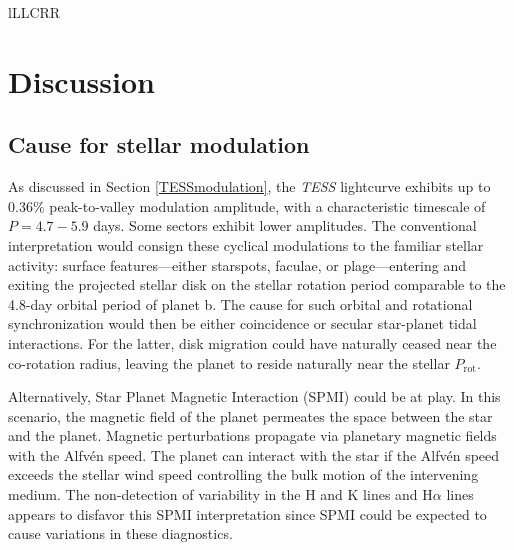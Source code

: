\documentclass[twocolumn]{aastex631}
\begin{document}
\begin{deluxetable*}{lLLCRR}
    \tablewidth{0pc}
    \startdata
    
    \enddata
\end{deluxetable*}

\section{Discussion}\label{secDiscuss}

\subsection{Cause for stellar modulation}
As discussed in Section \ref{TESSmodulation}, the \emph{TESS} lightcurve exhibits up to $0.36\%$ peak-to-valley modulation amplitude, with a characteristic timescale of $P=4.7-5.9$ days. Some sectors exhibit lower amplitudes.  The conventional interpretation would consign these cyclical modulations to the familiar stellar activity: surface features---either starspots, faculae, or plage---entering and exiting the projected stellar disk on the stellar rotation period comparable to the 4.8-day orbital period of planet b.  The cause for such orbital and rotational synchronization would then be either coincidence or secular star-planet tidal interactions.  For the latter, disk migration could have naturally ceased near the co-rotation radius, leaving the planet to reside naturally near the stellar $P_\mathrm{rot}$.  

Alternatively, Star Planet Magnetic Interaction (SPMI) could be at play.  In this scenario, the magnetic field of the planet permeates the space between the star and the planet.  Magnetic perturbations propagate via planetary magnetic fields with the Alfv\'en speed.  The planet can interact with the star if the Alfv\'en speed exceeds the stellar wind speed controlling the bulk motion of the intervening medium.  The non-detection of variability in the  H and K lines and H$\alpha$ lines appears to disfavor this SPMI interpretation since SPMI could be expected to cause variations in these diagnostics.
\end{document}
